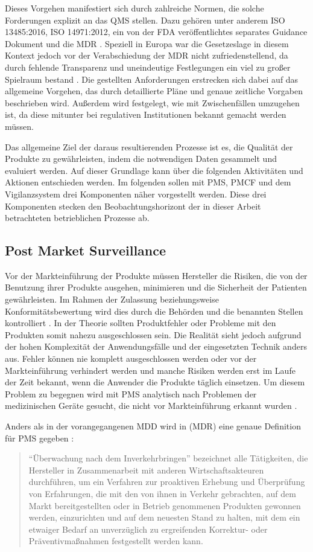 \documentclass[a4paper,12pt]{report}
\begin{document}
Dieses Vorgehen manifestiert sich durch zahlreiche Normen, die solche Forderungen explizit an das QMS stellen. Dazu gehören unter anderem ISO 13485:2016, ISO 14971:2012, ein von der FDA veröffentlichtes separates Guidance Dokument und die MDR \citep[vgl.][]{Johner2017}. Speziell in Europa war die Gesetzeslage in diesem Kontext jedoch vor der Verabschiedung der MDR nicht zufriedenstellend, da durch fehlende Transparenz und uneindeutige Festlegungen ein viel zu großer Spielraum bestand \citep[vgl.][S. 1]{Chowdhury2014}. Die gestellten Anforderungen erstrecken sich dabei auf das allgemeine Vorgehen, das durch detaillierte Pläne und genaue zeitliche Vorgaben beschrieben wird. Außerdem wird festgelegt, wie mit Zwischenfällen umzugehen ist, da diese mitunter bei regulativen Institutionen bekannt gemacht werden müssen.

Das allgemeine Ziel der daraus resultierenden Prozesse ist es, die Qualität der Produkte zu gewährleisten, indem die notwendigen Daten gesammelt und evaluiert werden. Auf dieser Grundlage kann über die folgenden Aktivitäten und Aktionen entschieden werden. Im folgenden sollen mit \ac{PMS}, \ac{PMCF} und dem Vigilanzsystem drei Komponenten näher vorgestellt werden. Diese drei Komponenten stecken den Beobachtungshorizont der in dieser Arbeit betrachteten betrieblichen Prozesse ab.
\subsection{Post Market Surveillance}\label{subsec:PMS}
Vor der Markteinführung der Produkte müssen Hersteller die Risiken, die von der Benutzung ihrer Produkte ausgehen, minimieren und die Sicherheit der Patienten gewährleisten. Im Rahmen der Zulassung beziehungsweise Konformitätsbewertung wird dies durch die Behörden und die benannten Stellen kontrolliert \citep[vgl.][]{Johner2017}. In der Theorie sollten Produktfehler oder Probleme mit den Produkten somit nahezu ausgeschlossen sein. Die Realität sieht jedoch aufgrund der hohen Komplexität der Anwendungsfälle und der eingesetzten Technik anders aus. Fehler können nie komplett ausgeschlossen werden oder vor der Markteinführung verhindert werden und manche Risiken werden erst im Laufe der Zeit bekannt, wenn die Anwender die Produkte täglich einsetzen. Um diesem Problem zu begegnen wird mit \ac{PMS} analytisch nach Problemen der medizinischen Geräte gesucht, die nicht vor Markteinführung erkannt wurden \citep[vgl.][S. 213]{DeMarco2011}.

Anders als in der vorangegangenen \ac{MDD} wird in \citep[Kapitel 1 Artikel 2 60.]{MDR2017} (MDR) eine genaue Definition für PMS gegeben \citep[vgl.][S. 1]{Pugh2017}: 
\begin{quote}
"`Überwachung nach dem Inverkehrbringen"' bezeichnet alle Tätigkeiten, die Hersteller in Zusammenarbeit mit anderen Wirtschaftsakteuren durchführen, um ein Verfahren zur proaktiven Erhebung und Überprüfung von Erfahrungen, die mit den von ihnen in Verkehr gebrachten, auf dem Markt bereitgestellten oder in Betrieb genommenen Produkten gewonnen werden, einzurichten und auf dem neuesten Stand zu halten, mit dem ein etwaiger Bedarf an unverzüglich zu ergreifenden Korrektur- oder Präventivmaßnahmen festgestellt werden kann. 
\end{quote}
\end{document}
